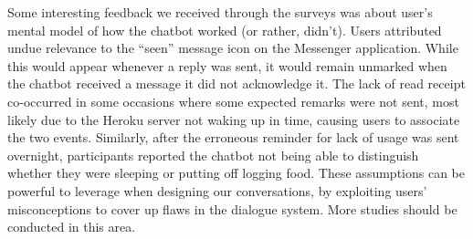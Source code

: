 Some interesting feedback we received through the surveys was about user's mental model of how the chatbot worked (or rather, didn't). Users attributed undue relevance to the ``seen'' message icon on the Messenger application. While this would appear whenever a reply was sent, it would remain unmarked when the chatbot received a message it did not acknowledge it. The lack of read receipt co-occurred in some occasions where some expected remarks were not sent, most likely due to the Heroku server not waking up in time, causing users to associate the two events. Similarly, after the erroneous reminder for lack of usage was sent overnight, participants reported the chatbot not being able to distinguish whether they were sleeping or putting off logging food. These assumptions can be powerful to leverage when designing our conversations, by exploiting users' misconceptions to cover up flaws in the dialogue system. More studies should be conducted in this area. \\


